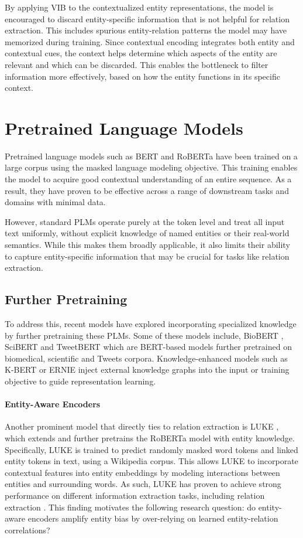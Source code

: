 \documentclass[11pt]{article}
\begin{document}
By applying VIB to the contextualized entity representations, the model is encouraged to discard entity-specific information that is not helpful for relation extraction. This includes spurious entity-relation patterns the model may have memorized during training. Since contextual encoding integrates both entity and contextual cues, the context helps determine which aspects of the entity are relevant and which can be discarded. This enables the bottleneck to filter information more effectively, based on how the entity functions in its specific context.


\section{Pretrained Language Models}

Pretrained language models such as BERT \cite{} and RoBERTa \cite{} have been trained on a large corpus using the masked language modeling objective. This training enables the model to acquire good contextual understanding of an entire sequence. As a result, they have proven to be effective across a range of downstream tasks and domains with minimal data.


However, standard PLMs operate purely at the token level and treat all input text uniformly, without explicit knowledge of named entities or their real-world semantics. While this makes them broadly applicable, it also limits their ability to capture entity-specific information that may be crucial for tasks like relation extraction.

\subsection{Further Pretraining}
To address this, recent models have explored incorporating specialized knowledge by further pretraining these PLMs. Some of these models include, BioBERT \cite{}, SciBERT \cite{} and TweetBERT which are BERT-based models further pretrained on biomedical, scientific and Tweets corpora. Knowledge-enhanced models such as K-BERT \cite{} or ERNIE \cite{} inject external knowledge graphs into the input or training objective to guide representation learning.

\paragraph{Entity-Aware Encoders} Another prominent model that directly ties to relation extraction is LUKE \cite{}, which extends and further pretrains the RoBERTa model with entity knowledge. Specifically, LUKE is trained to predict randomly masked word tokens and linked entity tokens in text, using a Wikipedia corpus. This allows LUKE to incorporate contextual features into entity embeddings by modeling interactions between entities and surrounding words. As such, LUKE has proven to achieve strong performance on different information extraction tasks, including relation extraction \cite{}. This finding motivates the following research question: do entity-aware encoders amplify entity bias by over-relying on learned entity-relation correlations? 
\end{document}
